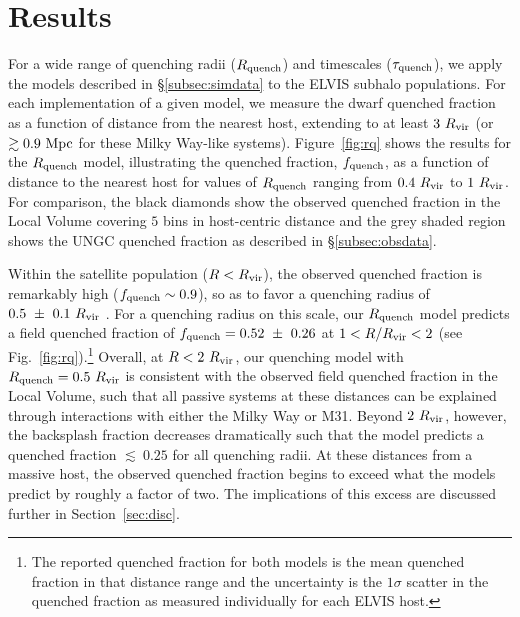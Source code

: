 \documentclass[usenatbib]{mnras}
\newcommand{\rvir}{R_{\rm vir}}
\begin{document}



\section{Results}
\label{sec:results}

For a wide range of quenching radii ($R_{\rm quench}$) and timescales
($\tau_{\rm quench}$), we apply the models described in
\S\ref{subsec:simdata} to the ELVIS subhalo populations. 
%
For each implementation of a given model, we measure the dwarf
quenched fraction as a function of distance from the nearest host,
extending to at least $3~\rvir$ (or $\gtrsim 0.9~{\rm Mpc}$ for these
Milky Way-like systems).
%
Figure~\ref{fig:rq} shows the results for the $R_{\rm quench}$ model,
illustrating the quenched fraction, $f_{\rm quench}$, as a function of distance
to the nearest host for values of $R_{\rm quench}$ ranging from $0.4~\rvir$ to
$1~\rvir$.
%
For comparison, the black diamonds show the observed quenched fraction in the
Local Volume covering $5$ bins in host-centric distance and the grey
shaded region shows the UNGC quenched fraction as described in
\S\ref{subsec:obsdata}. 
%


Within the satellite population ($R < \rvir$), the observed quenched fraction is
remarkably high ($f_{\rm quench} \sim 0.9$), so as to favor a quenching radius
of $0.5~\pm~0.1~\rvir$ \citep{fham15}.
%
For a quenching radius on this scale, our $R_{\rm quench}$ model predicts a
field quenched fraction of $f_{\rm quench}=0.52~\pm~0.26$ at $1 < R/\rvir < 2$
(see Fig.~\ref{fig:rq}).\footnote{The reported quenched fraction for both models
  is the mean quenched fraction in that distance range and the uncertainty is
  the $1\sigma$ scatter in the quenched fraction as measured individually for
  each ELVIS host.}
%
Overall, at $R < 2~\rvir$, our quenching model with $R_{\rm quench} = 0.5~\rvir$
is consistent with the observed field quenched fraction in the Local Volume,
such that all passive systems at these distances can be explained through
interactions with either the Milky Way or M31.
%
Beyond $2~\rvir$, however, the backsplash fraction decreases dramatically such
that the model predicts a quenched fraction $\lesssim~0.25$ for all quenching
radii.
%
At these distances from a massive host, the observed quenched fraction begins to
exceed what the models predict by roughly a factor of two. The implications of
this excess are discussed further in Section~\ref{sec:disc}.
\end{document}
